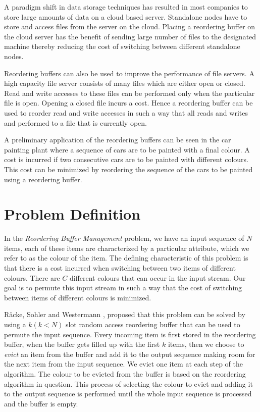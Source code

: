A paradigm shift in data storage techniques has resulted in most companies to
store large amounts of data on a cloud based server. Standalone nodes have to
store and access files from the server on the cloud. Placing a reordering buffer
on the cloud server has the benefit of sending large number of files to the
designated machine thereby reducing the cost of switching between different
standalone nodes.

Reordering buffers can also be used to improve the performance of file servers. A
high capacity file server consists of many files which are either open or
closed. Read and write accesses to these files can be performed only when the
particular file is open. Opening a closed file incurs a cost. Hence a reordering
buffer can be used to reorder read and write accesses in such a way that all
reads and writes and performed to a file that is currently open. 

A preliminary application of the reordering buffers can be seen in the car
painting plant where a sequence of cars are to be painted with a final colour. A
cost is incurred if two consecutive cars are to be painted with different
colours. This cost can be minimized by reordering the sequence of the cars to be
painted using a reordering buffer. 

\section{Problem Definition}

In the \textit{Reordering Buffer Management} problem, we have an input sequence of $N$ items, each of these items are characterized by a particular attribute, which we refer to as the colour of the item.  The defining characteristic of this problem is that there is a cost incurred when switching between two items of different colours. There are $C$ different colours that can occur in the input stream. Our goal is to permute this input stream in such a way that the cost of switching between items of different colours is minimized. 

R\"acke, Sohler and Westermann \cite{racke2002online}, proposed that this problem can be solved by using a $k (k < N)$ slot random access reordering buffer that can be used to permute the input sequence. Every incoming item is first stored in the reordering buffer, when the buffer gets filled up with the first $k$ items, then we choose to \textit{evict} an item from the buffer and add it to the output sequence making room for the next item from the input sequence. We evict one item at each step of the algorithm. The colour to be evicted from the buffer is based on the reordering algorithm in question. This process of selecting the colour to evict and adding it to the output sequence is performed until the whole input sequence is processed and the buffer is empty. 

